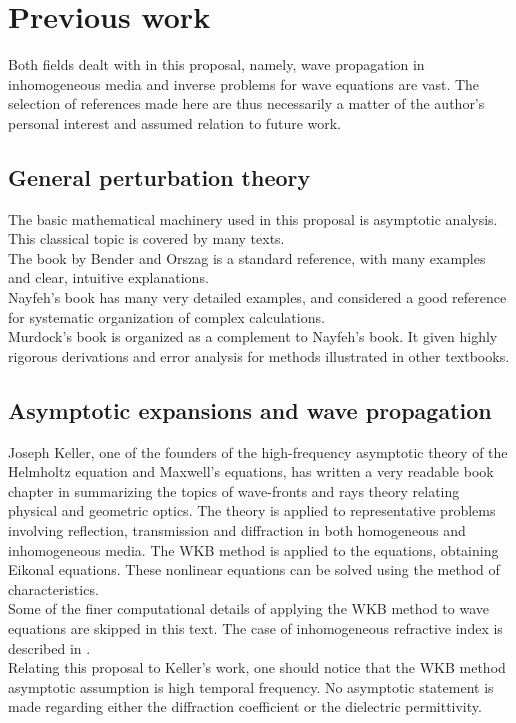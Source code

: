 \documentclass[12pt,twoside]{report}
\begin{document}
\section{Previous work}
Both fields dealt with in this proposal, namely, wave propagation in inhomogeneous media and inverse problems for wave equations are vast. The selection of references made here are thus necessarily a matter of the author's personal interest and assumed relation to future work.

\subsection{General perturbation theory}
The basic mathematical machinery used in this proposal is asymptotic analysis. This classical topic is covered by many texts. \\
The book by Bender and Orszag \cite{BenderOrszag1999} is a standard reference, with many examples and clear, intuitive explanations.\\
Nayfeh's book \cite{Nayfeh1981} has many very detailed examples, and considered a good reference for systematic organization of complex calculations.\\
Murdock's book is organized as a complement to Nayfeh's book. It given highly rigorous derivations and error analysis for methods illustrated in other textbooks.

\subsection{Asymptotic expansions and wave propagation}
Joseph Keller, one of the founders of the high-frequency asymptotic theory of the Helmholtz equation and Maxwell's equations, has written a very readable book chapter in \cite{KellerSurvey1995} summarizing the topics of wave-fronts and rays theory relating physical and geometric optics. The theory is applied to representative problems involving reflection, transmission and diffraction in both homogeneous and inhomogeneous media. The WKB method is applied to the equations, obtaining Eikonal equations. These nonlinear equations can be solved using the method of characteristics. \\
Some of the finer computational details of applying the WKB method to wave equations are skipped in this text. The case of inhomogeneous refractive index is described in \cite{SacklerKeller1959}. \\

Relating this proposal to Keller's work, one should notice that the WKB method asymptotic assumption is high temporal frequency. No asymptotic statement is made regarding either the diffraction coefficient or the dielectric permittivity.  \\
\end{document}

